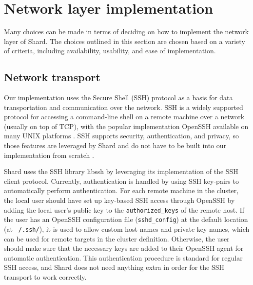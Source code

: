 \documentclass[oneside]{report}
\begin{document}
\section{Network layer implementation}


Many choices can be made in terms of deciding on how to implement the network layer of Shard.
The choices outlined in this section are chosen based on a variety of criteria, including availability, usability, and ease of implementation.

\subsection{Network transport}
Our implementation uses the Secure Shell (SSH) protocol as a basis for data transportation and communication over the network.
SSH is a widely supported protocol for accessing a command-line shell on a remote machine over a network (usually on top of TCP), with the popular implementation OpenSSH available on many UNIX platforms \cite{openssh}.
SSH supports security, authentication, and privacy, so those features are leveraged by Shard and do not have to be built into our implementation from scratch \cite{rfc4251}.

Shard uses the SSH library libssh by leveraging its implementation of the SSH client protocol.
Currently, authentication is handled by using SSH key-pairs to automatically perform authentication.
For each remote machine in the cluster, the local user should have set up key-based SSH access through OpenSSH by adding the local user's public key to the \texttt{authorized\_keys} of the remote host.
If the user has an OpenSSH configuration file (\texttt{sshd\_config}) at the default location (at \texttt{~/.ssh/}), it is used to allow custom host names and private key names, which can be used for remote targets in the cluster definition.
Otherwise, the user should make sure that the necessary keys are added to their OpenSSH agent for automatic authentication.
This authentication procedure is standard for regular SSH access, and Shard does not need anything extra in order for the SSH transport to work correctly.
\end{document}
